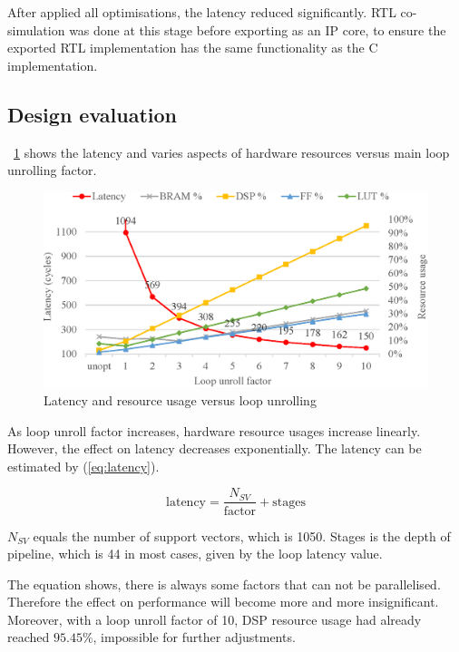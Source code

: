 \documentclass[journal]{IEEEtran}
\newcommand{\fref}[1]{\figurename~\ref{#1}}
\newcommand{\eref}[1]{(\ref{#1})}
\newcommand{\improvi}[1]{\improv[inline]{#1}}
\begin{document}
After applied all optimisations, the latency reduced significantly. RTL co-simulation was done at this stage before exporting as an IP core, to ensure the exported RTL implementation has the same functionality as the C implementation.

\subsection{Design evaluation}

\fref{fig:latency} shows the latency and varies aspects of hardware resources versus main loop unrolling factor.

\begin{figure}[ht]
	\centering
	\includegraphics[width=\columnwidth]{latency}
	\caption{Latency and resource usage versus loop unrolling}
	\label{fig:latency}
\end{figure}

As loop unroll factor increases, hardware resource usages increase linearly. However, the effect on latency decreases exponentially. The latency can be estimated by \eref{eq:latency}.

\begin{equation}
	\text{latency} = \frac{N_{SV}}{\text{factor}} + \text{stages}
	\label{eq:latency}
\end{equation}

$N_{SV}$ equals the number of support vectors, which is 1050. Stages is the depth of pipeline, which is 44 in most cases, given by the loop latency value.

The equation shows, there is always some factors that can not be parallelised. Therefore the effect on performance will become more and more insignificant. Moreover, with a loop unroll factor of 10, DSP resource usage had already reached $95.45 \%$, impossible for further adjustments.

\improvi{More?}
\end{document}
